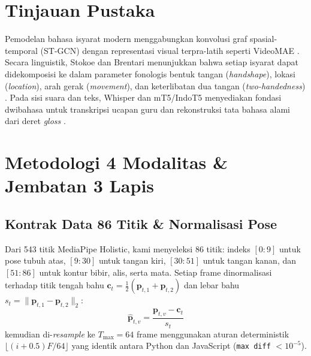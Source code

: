 \documentclass[conference]{IEEEtran}
\begin{document}
\section{Tinjauan Pustaka}
Pemodelan bahasa isyarat modern menggabungkan konvolusi graf spasial-temporal (ST-GCN) \cite{tupal2023fsl} dengan representasi visual terpra-latih seperti VideoMAE \cite{tong2022videomae,chen2022twostream}. Secara linguistik, Stokoe \cite{stokoe1960sign} dan Brentari \cite{brentari1998prosodic} menunjukkan bahwa setiap isyarat dapat didekomposisi ke dalam parameter fonologis bentuk tangan (\textit{handshape}), lokasi (\textit{location}), arah gerak (\textit{movement}), dan keterlibatan dua tangan (\textit{two-handedness}) \cite{zhang2024scaling}. Pada sisi suara dan teks, Whisper \cite{radford2023whisper} dan mT5/IndoT5 \cite{xue2021mt5,putra2024indot5} menyediakan fondasi dwibahasa untuk transkripsi ucapan guru dan rekonstruksi tata bahasa alami dari deret \textit{gloss} \cite{zuo2023natural,wong2024signbridge}.

\section{Metodologi 4 Modalitas \& Jembatan 3 Lapis}

\subsection{Kontrak Data 86 Titik \& Normalisasi Pose}
Dari 543 titik MediaPipe Holistic, kami menyeleksi 86 titik: indeks $[0:9]$ untuk pose tubuh atas, $[9:30]$ untuk tangan kiri, $[30:51]$ untuk tangan kanan, dan $[51:86]$ untuk kontur bibir, alis, serta mata. Setiap frame dinormalisasi terhadap titik tengah bahu $\mathbf{c}_t = \frac{1}{2}(\mathbf{p}_{t,1} + \mathbf{p}_{t,2})$ dan lebar bahu $s_t = \|\mathbf{p}_{t,1} - \mathbf{p}_{t,2}\|_2$:
\begin{equation}
\hat{\mathbf{p}}_{t,v} = \frac{\mathbf{p}_{t,v} - \mathbf{c}_t}{s_t}
\end{equation}
kemudian di-\textit{resample} ke $T_{\max}=64$ frame menggunakan aturan deterministik $\lfloor(i+0.5)F/64\rfloor$ yang identik antara Python dan JavaScript (\texttt{max diff} $< 10^{-5}$).
\end{document}
